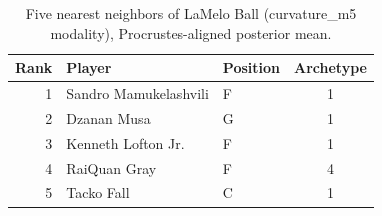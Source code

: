 \begin{table}[htbp]
  \centering\small
  \begin{tabular}{rllc}
    \toprule
    Rank & Player & Position & Archetype \\
    \midrule
    1 & Sandro Mamukelashvili & F & 1 \\
    2 & Dzanan Musa & G & 1 \\
    3 & Kenneth Lofton Jr. & F & 1 \\
    4 & RaiQuan Gray & F & 4 \\
    5 & Tacko Fall & C & 1 \\
    \bottomrule
  \end{tabular}
  \caption{Five nearest neighbors of LaMelo Ball (curvature_m5 modality), Procrustes-aligned posterior mean.}
  \label{tab:LaMelo_Ball_neighbors_curvature_m5}
\end{table}


